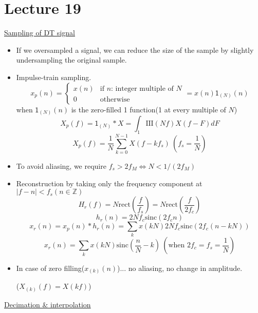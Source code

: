 \documentclass{article}
\newcommand{\shah}[1]{\mathrm{III}\left(#1\right)}
\newcommand{\rect}[1]{\mathrm{rect}\left(#1\right)}
\newcommand{\sinc}[1]{\mathrm{sinc}\left(#1\right)}
\begin{document}
\section{Lecture 19}
\underline{Sampling of DT signal}
\begin{itemize}
    \item If we oversampled a signal, we can reduce the size of the sample by slightly undersampling the original sample.
    \item Impulse-train sampling.
    \[x_p(n)=\begin{cases}
    x(n) & \text{if }n\text{: integer multiple of }N\\
    0 & \text{otherwise}
    \end{cases}=x(n)\mathsf{1}_{(N)}(n)\]
    when $\mathsf{1}_{(N)}(n)$ is the zero-filled 1 function(1 at every multiple of $N$)
    \[X_p(f)=\mathsf{1}_{(N)}*X=\int_1 \shah{Nf}X(f-F)dF\]
    \[X_p(f) = \dfrac{1}{N}\sum_{k=0}^{N-1}X(f-kf_s)\:(f_s=\dfrac{1}{N})\]
    \item To avoid aliasing, we require $f_s > 2f_M\Leftrightarrow N < 1/(2f_M)$
    \item Reconstruction by taking only the frequency component at $|f-n|<f_s(n\in\mathbb{Z})$
    \[H_r(f)=N\rect{\dfrac{f}{f_s}}=N\rect{\dfrac{f}{2f_c}}\]
    \[h_r(n)=2Nf_c\sinc{2f_cn}\]
    \[x_r(n)=x_p(n)*h_r(n)=\sum_k x(kN)2Nf_c\sinc{2f_c(n-kN)}\]
    \[x_r(n)=\sum_k x(kN)\sinc{\dfrac{n}{N}-k}\:(\text{when }2f_c=f_s=\dfrac{1}{N})\]
    
    \item In case of zero filling($x_{(k)}(n)$)... no aliasing, no change in amplitude.
    
    ($X_{(k)}(f)=X(kf)$)
\end{itemize}
\underline{Decimation \& interpolation}
\end{document}
